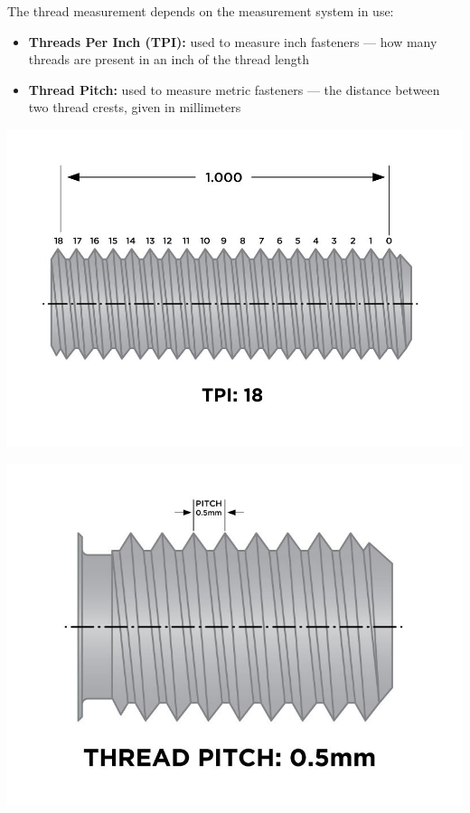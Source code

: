 \documentclass[english,]{article}
\providecommand{\tightlist}{%
  \setlength{\itemsep}{0pt}\setlength{\parskip}{0pt}}
\begin{document}
\hypertarget{iyw6xn}{}
The thread measurement depends on the measurement system in use:

\begin{itemize}
\tightlist
\item
  \textbf{Threads Per Inch (TPI):} used to measure inch fasteners ---
  how many threads are present in an inch of the thread length
\item
  \textbf{Thread Pitch:} used to measure metric fasteners --- the
  distance between two thread crests, given in millimeters
\end{itemize}

\includegraphics{Introduction to Nut and Bolt Sizes_files/62ffe00403d64741542980.jpg}

\hypertarget{i5uow1}{}
\includegraphics{Introduction to Nut and Bolt Sizes_files/62ffe01b5939b908779409.jpg}
\end{document}
